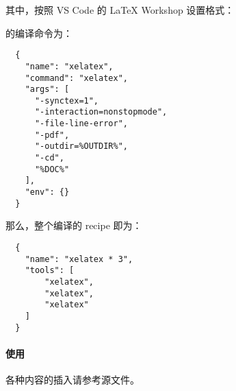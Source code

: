 其中，按照 VS Code 的 LaTeX Workshop 设置格式：

{} 的编译命令为：
\begin{verbatim}
  {
    "name": "xelatex",
    "command": "xelatex",
    "args": [
      "-synctex=1",
      "-interaction=nonstopmode",
      "-file-line-error",
      "-pdf",
      "-outdir=%OUTDIR%",
      "-cd",
      "%DOC%"
    ],
    "env": {}
  }
\end{verbatim}

那么，整个编译的 recipe 即为：

\begin{verbatim}
  {
    "name": "xelatex * 3",
    "tools": [
        "xelatex",
        "xelatex",
        "xelatex"
    ]
  }
\end{verbatim}

\paragraph{使用}

各种内容的插入请参考源文件。
